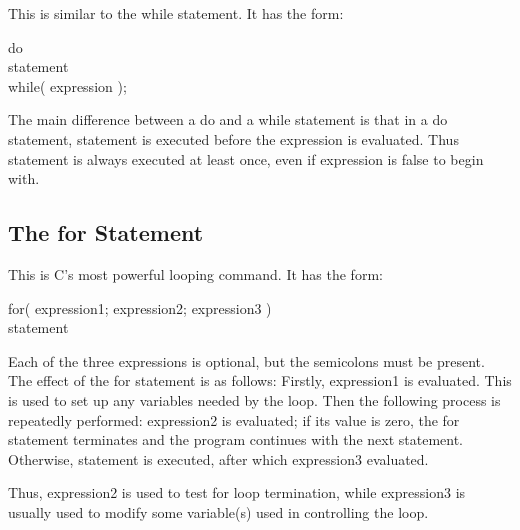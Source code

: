      This is similar to the {\cd while} statement. It has the form:
\begin{code}
do  \\
 \> {\ms statement\/} \\
while( {\ms expression\/} );
\end{code}
\noindent
     The main  difference between  a {\cd do}  and a {\cd while}
statement is that in a {\cd do} statement, {\ms statement\/} is 
executed  before the  {\ms expression\/}  is evaluated. Thus 
{\ms statement\/} is always executed at least once, even if
{\ms expression\/} is false to begin with.


\subsection{The {\cd for} Statement}

     This is C's most powerful looping command. It has the form:
\begin{code}
for( {\ms expression1\/}; {\ms expression2\/}; {\ms expression3\/} ) \\
 \> {\ms statement\/}
\end{code}
\noindent
     Each of  the three  expressions is  optional, but  the
semicolons must be present. The effect of the {\cd for} statement is
as follows:  Firstly, {\ms expression1\/} is evaluated. This  is used
to set up any variables needed by the loop. Then the following
process is repeatedly performed:  {\ms expression2\/} is  evaluated;
if  its value is  zero, the {\cd for} statement terminates and  the
program  continues with the next statement. Otherwise,  {\ms
statement\/} is executed, after which {\ms expression3\/} evaluated.

     Thus, {\ms expression2\/}  is used to test for loop
termination, while  {\ms expression3\/} is  usually used  to modify 
some  variable(s)  used  in controlling the loop.

